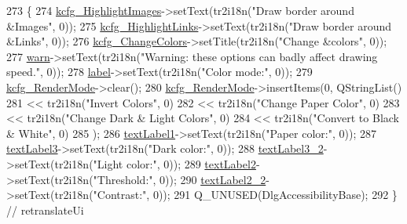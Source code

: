 \begin{DoxyCode}
273     \{
274         \hyperlink{classUi__DlgAccessibilityBase_a06bcf6b5838dd7dd61e796416b064b6b}{kcfg\_HighlightImages}->setText(tr2i18n(\textcolor{stringliteral}{"Draw border around &Images"}, 0));
275         \hyperlink{classUi__DlgAccessibilityBase_aa5b4ab2a5fa80185e567cdfd3af9b3c8}{kcfg\_HighlightLinks}->setText(tr2i18n(\textcolor{stringliteral}{"Draw border around &Links"}, 0));
276         \hyperlink{classUi__DlgAccessibilityBase_ad69ec5ae9e5bad5756a57dac036500eb}{kcfg\_ChangeColors}->setTitle(tr2i18n(\textcolor{stringliteral}{"Change &colors"}, 0));
277         \hyperlink{classUi__DlgAccessibilityBase_ad66df65b95e80cd067b2e387ca0052b2}{warn}->setText(tr2i18n(\textcolor{stringliteral}{"Warning: these options can badly affect drawing speed."}, 0));
278         \hyperlink{classUi__DlgAccessibilityBase_af08bc2aa14cf40f1a58ce05b6d98fef6}{label}->setText(tr2i18n(\textcolor{stringliteral}{"Color mode:"}, 0));
279         \hyperlink{classUi__DlgAccessibilityBase_a8eaeef4919006d3f9225067d5fa6f5e7}{kcfg\_RenderMode}->clear();
280         \hyperlink{classUi__DlgAccessibilityBase_a8eaeef4919006d3f9225067d5fa6f5e7}{kcfg\_RenderMode}->insertItems(0, QStringList()
281          << tr2i18n(\textcolor{stringliteral}{"Invert Colors"}, 0)
282          << tr2i18n(\textcolor{stringliteral}{"Change Paper Color"}, 0)
283          << tr2i18n(\textcolor{stringliteral}{"Change Dark & Light Colors"}, 0)
284          << tr2i18n(\textcolor{stringliteral}{"Convert to Black & White"}, 0)
285         );
286         \hyperlink{classUi__DlgAccessibilityBase_a8487704a7e035affc3a6ef7f80572d21}{textLabel1}->setText(tr2i18n(\textcolor{stringliteral}{"Paper color:"}, 0));
287         \hyperlink{classUi__DlgAccessibilityBase_ab4f97510e236d55ac92d0c0befc04068}{textLabel3}->setText(tr2i18n(\textcolor{stringliteral}{"Dark color:"}, 0));
288         \hyperlink{classUi__DlgAccessibilityBase_a87a49764d21731bab617cdbe42f2b263}{textLabel3\_2}->setText(tr2i18n(\textcolor{stringliteral}{"Light color:"}, 0));
289         \hyperlink{classUi__DlgAccessibilityBase_a86309f7fdcc0194a41f39ae3bc98fa6e}{textLabel2}->setText(tr2i18n(\textcolor{stringliteral}{"Threshold:"}, 0));
290         \hyperlink{classUi__DlgAccessibilityBase_a2994502da41dffae4e1691734c4c352b}{textLabel2\_2}->setText(tr2i18n(\textcolor{stringliteral}{"Contrast:"}, 0));
291         Q\_UNUSED(DlgAccessibilityBase);
292     \} \textcolor{comment}{// retranslateUi}
\end{DoxyCode}
